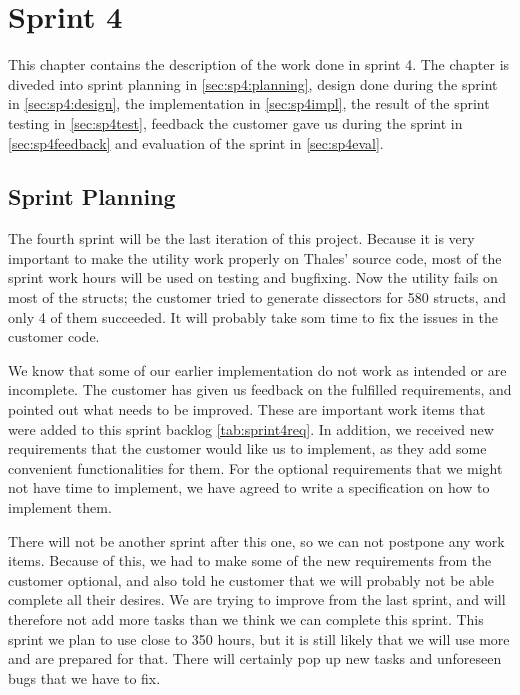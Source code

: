 \chapter{Sprint 4}
This chapter contains the description of the work done in sprint 4. The 
chapter is diveded into sprint planning in \autoref{sec:sp4:planning}, design 
done during the sprint in \autoref{sec:sp4:design}, the implementation in 
\autoref{sec:sp4impl}, the result of the sprint testing in 
\autoref{sec:sp4test}, feedback the customer gave us during the sprint in 
\autoref{sec:sp4feedback} and evaluation of the sprint in 
\autoref{sec:sp4eval}.

\section{Sprint Planning}
\label{sec:sp4:planning}
The fourth sprint will be the last iteration of this project. Because it is very important to make the \gls{utility} work properly on Thales' source code, most of the sprint work hours will be used on testing and bugfixing. Now the \gls{utility} fails on most of the \glspl{struct}; the customer tried to generate \glspl{dissector} for 580 \glspl{struct}, and only 4 of them succeeded. It will probably take som time to fix the issues in the customer code.

We know that some of our earlier implementation do not work as intended or are incomplete. The customer has given us feedback on the fulfilled requirements, and pointed out what needs to be improved. These are important work items that were added to this sprint backlog \ref{tab:sprint4req}. In addition, we received new requirements that the customer would like us to implement, as they add some convenient functionalities for them. For the optional requirements that we might not have time to implement, we have agreed to write a specification on how to implement them. 

There will not be another sprint after this one, so we can not postpone any work items. Because of this, we had to make some of the new requirements from the customer optional, and also told he customer that we will probably not be able complete all their desires. We are trying to improve from the last sprint, and will therefore not add more tasks than we think we can complete this sprint. This sprint we plan to use close to 350 hours, but it is still likely that we will use more and are prepared for that. There will certainly pop up new tasks and unforeseen bugs that we have to fix.

